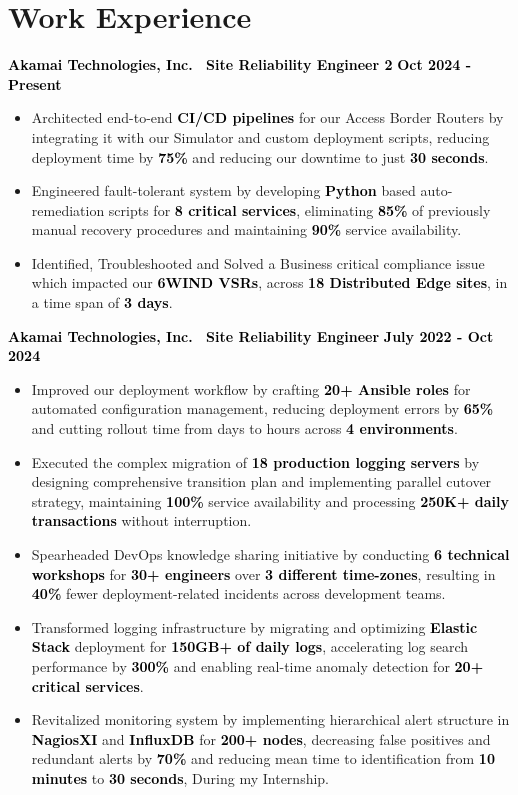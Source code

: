 \documentclass[a4paper,10pt]{article}
\newcommand{\bb}[1]{\textcolor{black}{\textbf{#1}}}
\begin{document}
\section{Work Experience}
\bb{ Akamai Technologies, Inc. \textbar\ Site Reliability Engineer 2 } \hfill \bb{Oct 2024 - Present}
\begin{itemize}[nosep, leftmargin=2em, itemsep=3pt]
    \item Architected end-to-end \bb{CI/CD pipelines} for our Access Border Routers by integrating it with our Simulator and custom deployment scripts, reducing deployment time by \bb{75\%} and reducing our downtime to just \bb{30 seconds}.
    \item Engineered fault-tolerant system by developing \bb{Python} based auto-remediation scripts for \bb{8 critical services}, eliminating \bb{85\%} of previously manual recovery procedures and maintaining \bb{90\%} service availability.
    \item Identified, Troubleshooted and Solved a Business critical compliance issue which impacted our \bb{6WIND VSRs}, across \bb{18 Distributed Edge sites}, in a time span of \bb{3 days}.
\end{itemize}
\medskip\bb{ Akamai Technologies, Inc. \textbar\ Site Reliability Engineer } \hfill \bb{July 2022 - Oct 2024}
\begin{itemize}[nosep, leftmargin=2em, itemsep=3pt]
    \item Improved our deployment workflow by crafting \bb{20+ Ansible roles} for automated configuration management, reducing deployment errors by \bb{65\%} and cutting rollout time from days to hours across \bb{4 environments}.
    \item Executed the complex migration of \bb{18 production logging servers} by designing comprehensive transition plan and implementing parallel cutover strategy, maintaining \bb{100\%} service availability and processing \bb{250K+ daily transactions} without interruption.
    \item Spearheaded DevOps knowledge sharing initiative by conducting \bb{6 technical workshops} for \bb{30+ engineers} over \bb{3 different time-zones}, resulting in \bb{40\%} fewer deployment-related incidents across development teams.
    \item Transformed logging infrastructure by migrating and optimizing \bb{Elastic Stack} deployment for \bb{150GB+ of daily logs}, accelerating log search performance by \bb{300\%} and enabling real-time anomaly detection for \bb{20+ critical services}.
    \item Revitalized monitoring system by implementing hierarchical alert structure in \bb{NagiosXI} and \bb{InfluxDB} for \bb{200+ nodes}, decreasing false positives and redundant alerts by \bb{70\%} and reducing mean time to identification from \bb{10 minutes} to \bb{30 seconds}, During my Internship.
\end{itemize}
\vspace{-1em}
%
%
\end{document}
